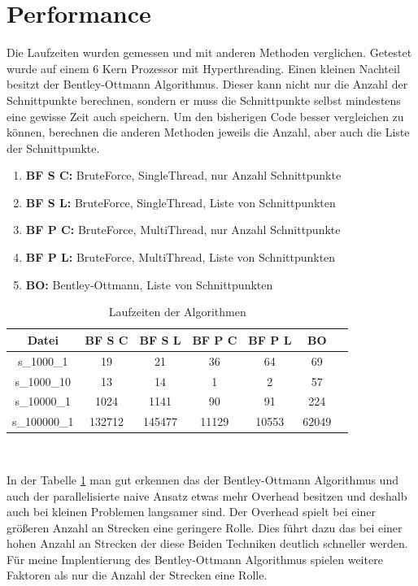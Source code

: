 \documentclass[conference]{IEEEtran}
\begin{document}
	\section{Performance}
	Die Laufzeiten wurden gemessen und mit anderen Methoden verglichen. Getestet wurde auf einem 6 Kern Prozessor mit Hyperthreading. Einen kleinen Nachteil besitzt der Bentley-Ottmann Algorithmus. Dieser kann nicht nur die Anzahl der Schnittpunkte berechnen, sondern er muss die Schnittpunkte selbst mindestens eine gewisse Zeit auch speichern. Um den bisherigen Code besser vergleichen zu können, berechnen die anderen Methoden jeweils die Anzahl, aber auch die Liste der Schnittpunkte.\\
	\begin{enumerate}
		\item \textbf{BF S C:} BruteForce, SingleThread, nur Anzahl Schnittpunkte
		\item \textbf{BF S L:} BruteForce, SingleThread, Liste von Schnittpunkten
		\item \textbf{BF P C:} BruteForce, MultiThread, nur Anzahl Schnittpunkte
		\item \textbf{BF P L:} BruteForce, MultiThread, Liste von Schnittpunkten
		\item \textbf{BO:} Bentley-Ottmann, Liste von Schnittpunkten
	\end{enumerate}
	\begin{table}[h!]
		\small
		\begin{tabular}{|c|c|c|c|c|c|c|}
			\hline
			Datei & BF S C & BF S L & BF P C & BF P L & BO \\
			\hline
			s\_1000\_1 & 19 & 21 & 36 & 64 & 69\\
			\hline
			s\_1000\_10 & 13 & 14 & 1 & 2 & 57\\
			\hline
			s\_10000\_1 & 1024 & 1141 & 90 & 91 & 224\\
			\hline
			s\_100000\_1 & 132712 & 145477 & 11129 & 10553 & 62049\\
			\hline
		\end{tabular}\\
	    \caption{Laufzeiten der Algorithmen}
	    \label{tabLauf}
	\end{table}
	\vspace{0.1cm}
	In der Tabelle \ref{tabLauf} man gut erkennen das der Bentley-Ottmann Algorithmus und auch der parallelisierte naive Ansatz etwas mehr Overhead besitzen und deshalb auch bei kleinen Problemen langsamer sind. Der Overhead spielt bei einer größeren Anzahl an Strecken eine geringere Rolle. Dies führt dazu das bei einer hohen Anzahl an Strecken der diese Beiden Techniken deutlich schneller werden.\\
	Für meine Implentierung des Bentley-Ottmann Algorithmus spielen weitere Faktoren als nur die Anzahl der Strecken eine Rolle.
\end{document}
